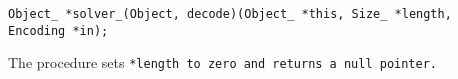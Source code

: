 
\tt{Object_ *solver_(Object, decode)(Object_ *this, Size_ *length, Encoding *in);}


The procedure sets \tt{*length} to zero and returns a null pointer.
